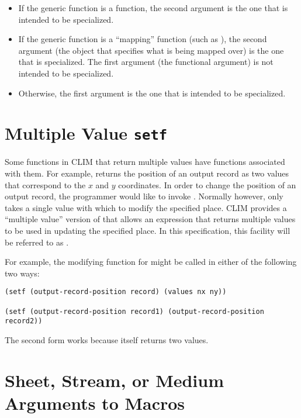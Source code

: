 \begin{itemize}
\item If the generic function is a  function, the second argument is
the one that is intended to be specialized.

\item If the generic function is a ``mapping'' function (such as
), the second argument (the object that
specifies what is being mapped over) is the one that is specialized.  The
first argument (the functional argument) is not intended to be specialized.

\item Otherwise, the first argument is the one that is intended to be
specialized.
\end{itemize}


\section {Multiple Value {\tt setf}}

Some functions in CLIM that return multiple values have  functions
associated with them.  For example,  returns the
position of an output record as two values that correspond to the $x$ and $y$
coordinates.  In order to change the position of an output record, the
programmer would like to invoke .  Normally
however,  only takes a single value with which to modify the specified
place.  CLIM provides a ``multiple value'' version of  that allows an
expression that returns multiple values to be used in updating the specified
place.  In this specification, this facility will be referred to as .

For example, the modifying function for  might be
called in either of the following two ways:

\begin{verbatim}
(setf (output-record-position record) (values nx ny))

(setf (output-record-position record1) (output-record-position record2))
\end{verbatim}

The second form works because  itself returns two
values.


\section {Sheet, Stream, or Medium Arguments to Macros}

